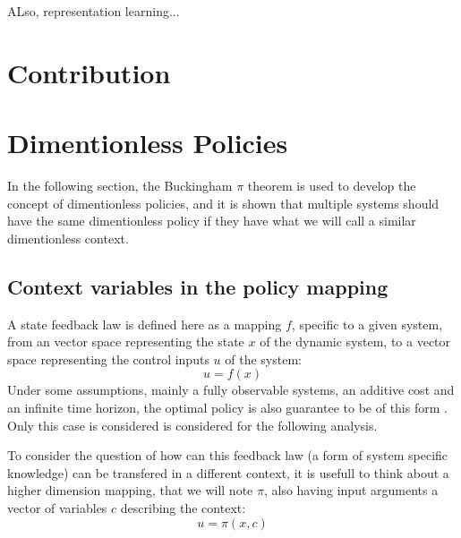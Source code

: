 ALso, representation learning...


\section{Contribution}








\section{Dimentionless Policies}
\label{sec:dimenanalysis}

In the following section, the Buckingham $\pi$ theorem is used to develop the concept of dimentionless policies, and it is shown that multiple systems should have the same dimentionless policy if they have what we will call a similar dimentionless context.

\subsection{Context variables in the policy mapping}

A state feedback law is defined here as a mapping $f$, specific to a given system,  from an vector space representing the state $x$ of the dynamic system, to a vector space representing the control inputs $u$ of the system:
\begin{equation}
u
=
f \left(
x
\right)
\end{equation}
Under some assumptions, mainly a fully observable systems, an additive cost and an infinite time horizon, the optimal policy is also guarantee to be of this form \cite{bertsekas_dynamic_2012}. Only this case is considered is considered for the following analysis.

To consider the question of how can this feedback law (a form of system specific knowledge) can be transfered in a different context, it is usefull to think about a higher dimension mapping, that we will note $\pi$, also having input arguments a vector of variables $c$ describing the context:
\begin{equation}
u
=
\pi \left(
x,
c
\right)
\end{equation}




